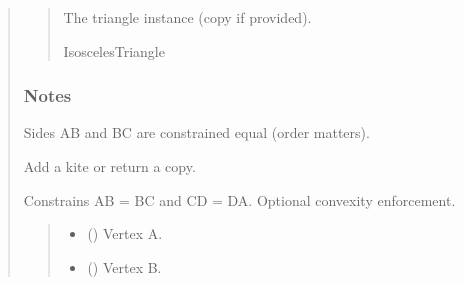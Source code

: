 \documentclass[letterpaper,10pt,english]{sphinxmanual}
\begin{document}
\begin{quote}
\begin{fulllineitems}
\begin{fulllineitems}
\begin{quote}
\begin{description}
\begin{itemize}
\end{itemize}

\sphinxAtStartPar
The triangle instance (copy if provided).

\sphinxAtStartPar
IsoscelesTriangle

\end{description}\end{quote}
\subsubsection*{Notes}

\sphinxAtStartPar
Sides AB and BC are constrained equal (order matters).

\end{fulllineitems}


\begin{fulllineitems}
\label{\detokenize{pygeox:pygeox.add_objects.AddNamespace.kite}}
\pysigstartsignatures
\pysiglinewithargsret
{}
{\sphinxparamcomma {}\sphinxparamcomma {}\sphinxparamcomma {}\sphinxparamcomma {}\sphinxparamcomma {}\sphinxparamcomma {}}
{}
\pysigstopsignatures
\sphinxAtStartPar
Add a kite or return a copy.

\sphinxAtStartPar
Constrains AB = BC and CD = DA. Optional convexity enforcement.
\begin{quote}\begin{description}
\begin{itemize}
\item {} 
\sphinxAtStartPar
{} (\sphinxstyleliteralemphasis{\sphinxupquote{ | }}) \textendash{} Vertex A.

\item {} 
\sphinxAtStartPar
{} (\sphinxstyleliteralemphasis{\sphinxupquote{ | }}) \textendash{} Vertex B.


\end{itemize}
\end{description}
\end{quote}
\end{fulllineitems}
\end{fulllineitems}
\end{quote}
\end{document}
